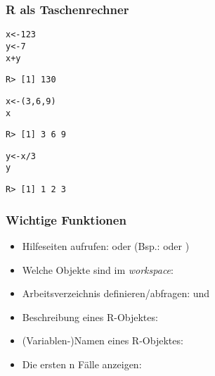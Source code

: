\begin{frame}\frametitle{R als Taschenrechner}
\begin{footnotesize}
\begin{knitrout}
\color{fgcolor}\begin{kframe}
\begin{alltt}
x <- 123
y <- 7
x + y
\end{alltt}
\begin{verbatim}
R> [1] 130
\end{verbatim}
\begin{alltt}

x <- (3, 6, 9)
x
\end{alltt}
\begin{verbatim}
R> [1] 3 6 9
\end{verbatim}
\begin{alltt}
y <- x/3
y
\end{alltt}
\begin{verbatim}
R> [1] 1 2 3
\end{verbatim}
\end{kframe}
\end{knitrout}

\end{footnotesize}
\end{frame}



\begin{frame}\frametitle{Wichtige Funktionen}
  \begin{itemize}
  \item Hilfeseiten aufrufen:  oder
     (Bsp.:  oder )
  \item Welche Objekte sind im \emph{workspace}: 
  \item Arbeitsverzeichnis definieren/abfragen:  und 
  \item Beschreibung eines R-Objektes: 
  \item (Variablen-)Namen eines R-Objektes: 
  \item Die ersten n Fälle anzeigen: 
  \end{itemize}
\end{frame}


